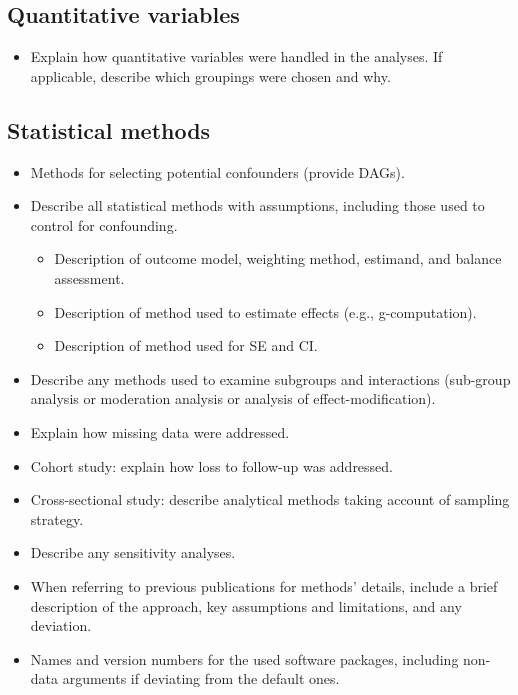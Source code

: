 \documentclass[
  letterpaper,
  DIV=11,
  numbers=noendperiod]{scrartcl}
\providecommand{\tightlist}{%
  \setlength{\itemsep}{0pt}\setlength{\parskip}{0pt}}\usepackage{longtable,booktabs,array}
\begin{document}
\subsection{Quantitative variables}\label{sec-quant-vars}

\begin{itemize}
\tightlist
\item
  Explain how quantitative variables were handled in the analyses. If
  applicable, describe which groupings were chosen and why.
\end{itemize}

\subsection{Statistical methods}\label{sec-stat-methods}

\begin{itemize}
\tightlist
\item
  Methods for selecting potential confounders (provide DAGs).
\item
  Describe all statistical methods with assumptions, including those
  used to control for confounding.

  \begin{itemize}
  \tightlist
  \item
    Description of outcome model, weighting method, estimand, and
    balance assessment.
  \item
    Description of method used to estimate effects (e.g.,
    g-computation).
  \item
    Description of method used for SE and CI.
  \end{itemize}
\item
  Describe any methods used to examine subgroups and interactions
  (sub-group analysis or moderation analysis or analysis of
  effect-modification).
\item
  Explain how missing data were addressed.
\item
  Cohort study: explain how loss to follow-up was addressed.
\item
  Cross-sectional study: describe analytical methods taking account of
  sampling strategy.
\item
  Describe any sensitivity analyses.
\item
  When referring to previous publications for methods' details, include
  a brief description of the approach, key assumptions and limitations,
  and any deviation.
\item
  Names and version numbers for the used software packages, including
  non-data arguments if deviating from the default ones.
\end{itemize}
\end{document}

